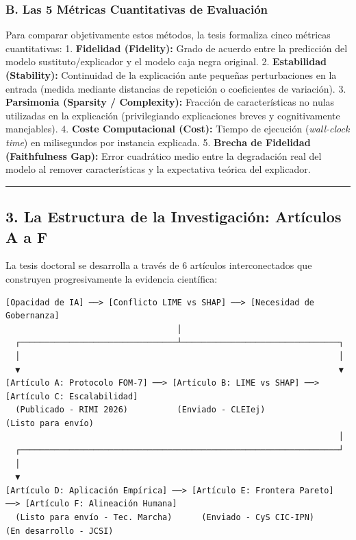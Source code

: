 \documentclass[
]{article}
\begin{document}
\subsubsection{B. Las 5 Métricas Cuantitativas de
Evaluación}\label{b.-las-5-muxe9tricas-cuantitativas-de-evaluaciuxf3n}

Para comparar objetivamente estos métodos, la tesis formaliza cinco
métricas cuantitativas: 1. \textbf{Fidelidad (Fidelity):} Grado de
acuerdo entre la predicción del modelo sustituto/explicador y el modelo
caja negra original. 2. \textbf{Estabilidad (Stability):} Continuidad de
la explicación ante pequeñas perturbaciones en la entrada (medida
mediante distancias de repetición o coeficientes de variación). 3.
\textbf{Parsimonia (Sparsity / Complexity):} Fracción de características
no nulas utilizadas en la explicación (privilegiando explicaciones
breves y cognitivamente manejables). 4. \textbf{Coste Computacional
(Cost):} Tiempo de ejecución (\emph{wall-clock time}) en milisegundos
por instancia explicada. 5. \textbf{Brecha de Fidelidad (Faithfulness
Gap):} Error cuadrático medio entre la degradación real del modelo al
remover características y la expectativa teórica del explicador.

\begin{center}\rule{0.5\linewidth}{0.5pt}\end{center}

\subsection{3. La Estructura de la Investigación: Artículos A a
F}\label{la-estructura-de-la-investigaciuxf3n-artuxedculos-a-a-f}

La tesis doctoral se desarrolla a través de 6 artículos interconectados
que construyen progresivamente la evidencia científica:

\begin{verbatim}
[Opacidad de IA] ──> [Conflicto LIME vs SHAP] ──> [Necesidad de Gobernanza]
                                   │
  ┌────────────────────────────────┴────────────────────────────────┐
  │                                                                 │
  ▼                                                                 ▼
[Artículo A: Protocolo FOM-7] ──> [Artículo B: LIME vs SHAP] ──> [Artículo C: Escalabilidad]
  (Publicado - RIMI 2026)          (Enviado - CLEIej)              (Listo para envío)
                                                                    │
  ┌─────────────────────────────────────────────────────────────────┘
  │
  ▼
[Artículo D: Aplicación Empírica] ──> [Artículo E: Frontera Pareto] ──> [Artículo F: Alineación Humana]
  (Listo para envío - Tec. Marcha)      (Enviado - CyS CIC-IPN)          (En desarrollo - JCSI)
\end{verbatim}
\end{document}
